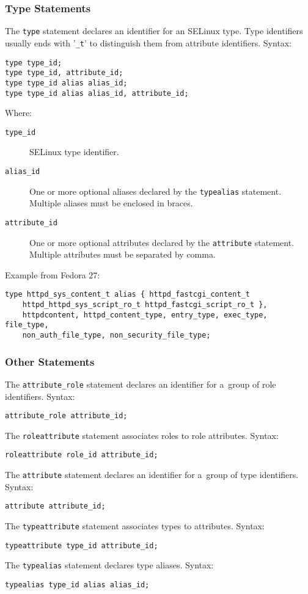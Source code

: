 \subsubsection{Type Statements}
The \texttt{type} statement declares an identifier for an SELinux type. Type
identifiers usually ends with '\texttt{\_t}' to distinguish them from attribute
identifiers. Syntax:
\begin{lstlisting}[language=te]
type type_id;
type type_id, attribute_id;
type type_id alias alias_id;
type type_id alias alias_id, attribute_id;
\end{lstlisting}
Where:
\begin{description}
    \item [\texttt{type\_id}] SELinux type identifier.
    \item [\texttt{alias\_id}] One or more optional aliases declared by the
        \texttt{typealias} statement. Multiple aliases must be enclosed in
        braces.
    \item [\texttt{attribute\_id}] One or more optional attributes declared by
        the \texttt{attribute} statement. Multiple attributes must be separated
        by comma.
\end{description}
Example from Fedora 27:
\begin{lstlisting}[language=te]
type httpd_sys_content_t alias { httpd_fastcgi_content_t
    httpd_httpd_sys_script_ro_t httpd_fastcgi_script_ro_t },
    httpdcontent, httpd_content_type, entry_type, exec_type, file_type,
    non_auth_file_type, non_security_file_type;
\end{lstlisting}

\subsubsection{Other Statements}
The \texttt{attribute\_role} statement declares an identifier for a~group of
role identifiers. Syntax:
\begin{lstlisting}[language=te]
attribute_role attribute_id;
\end{lstlisting}
The \texttt{roleattribute} statement associates roles to role attributes.
Syntax:
\begin{lstlisting}[language=te]
roleattribute role_id attribute_id;
\end{lstlisting}
The \texttt{attribute} statement declares an identifier for a~group of type
identifiers. Syntax:
\begin{lstlisting}[language=te]
attribute attribute_id;
\end{lstlisting}
The \texttt{typeattribute} statement associates types to attributes. Syntax:
\begin{lstlisting}[language=te]
typeattribute type_id attribute_id;
\end{lstlisting}
The \texttt{typealias} statement declares type aliases. Syntax:
\begin{lstlisting}[language=te]
typealias type_id alias alias_id;
\end{lstlisting}

